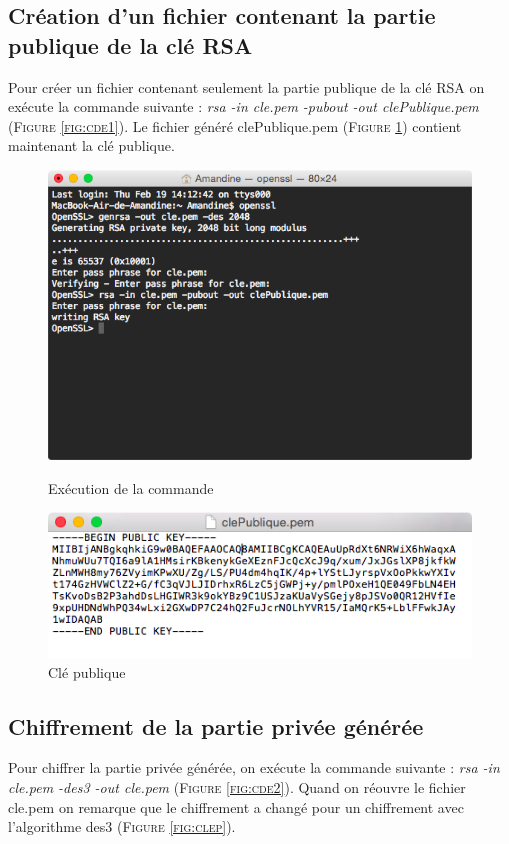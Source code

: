 \documentclass[11pt]{article}
\begin{document}
\subsection{Création d'un fichier contenant la partie publique de la clé RSA}
Pour créer un fichier contenant seulement la partie publique de la clé RSA on exécute la commande suivante : \textit{rsa -in cle.pem -pubout -out clePublique.pem} (\textsc{Figure \ref{fig:cde1}}). Le fichier généré clePublique.pem (\textsc{Figure \ref{fig:clepu}}) contient maintenant la clé publique.
\begin{figure}[hbtp]
    \begin{minipage}[b]{0.4\linewidth}
        \centering \includegraphics[scale=0.4]{Capture/question2.png}
        \caption{Exécution de la commande}
                \label{fig:cde1}
\label{fig:base}
    \end{minipage}\hfill
    \begin{minipage}[b]{0.48\linewidth}
        \centering \includegraphics[scale=0.4]{Capture/question2b.png}
        \caption{Clé publique}
         \label{fig:clepu}
    \end{minipage}
\end{figure}

\subsection{Chiffrement de la partie privée générée}
Pour chiffrer la partie privée générée, on exécute la commande suivante : \textit{rsa -in cle.pem -des3 -out cle.pem}  (\textsc{Figure \ref{fig:cde2}}). Quand on réouvre le fichier cle.pem on remarque que le chiffrement a changé pour un chiffrement avec l'algorithme des3 (\textsc{Figure \ref{fig:clep}}).
\end{document}

